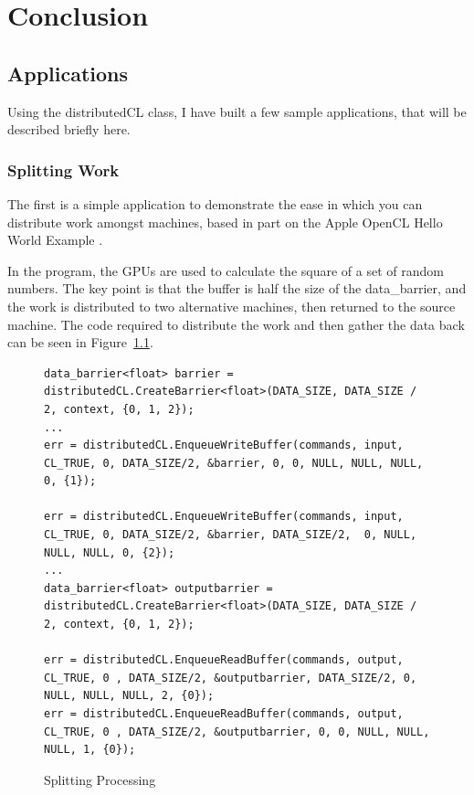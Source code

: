 \documentclass[../thesis.tex]{subfiles}
\begin{document}
\chapter{Conclusion}

\label{ch:conclusions}

\section{Applications}

Using the distributedCL class, I have built a few sample applications, that will be described briefly here.

\subsection{Splitting Work} %
\label{sub:splitting_work}

The first is a simple application to demonstrate the ease in which you can distribute work amongst machines, based in part on the Apple OpenCL Hello World Example \cite{applehelloworld}.

In the program, the GPUs are used to calculate the square of a set of random numbers. The key point is that the buffer is half the size of the data\_barrier, and the work is distributed to two alternative machines, then returned to the source machine. The code required to distribute the work and then gather the data back can be seen in Figure~\ref{fig:split_work}.

\begin{figure}[htbp]
    \centering
    \lstset{language=cpp}
    \begin{lstlisting}
data_barrier<float> barrier = distributedCL.CreateBarrier<float>(DATA_SIZE, DATA_SIZE / 2, context, {0, 1, 2});
...
err = distributedCL.EnqueueWriteBuffer(commands, input, CL_TRUE, 0, DATA_SIZE/2, &barrier, 0, 0, NULL, NULL, NULL, 0, {1});

err = distributedCL.EnqueueWriteBuffer(commands, input, CL_TRUE, 0, DATA_SIZE/2, &barrier, DATA_SIZE/2,  0, NULL, NULL, NULL, 0, {2});
...
data_barrier<float> outputbarrier = distributedCL.CreateBarrier<float>(DATA_SIZE, DATA_SIZE / 2, context, {0, 1, 2});

err = distributedCL.EnqueueReadBuffer(commands, output, CL_TRUE, 0 , DATA_SIZE/2, &outputbarrier, DATA_SIZE/2, 0, NULL, NULL, NULL, 2, {0});
err = distributedCL.EnqueueReadBuffer(commands, output, CL_TRUE, 0 , DATA_SIZE/2, &outputbarrier, 0, 0, NULL, NULL, NULL, 1, {0});
    \end{lstlisting}
    \caption{Splitting Processing}
    \label{fig:split_work}
\end{figure}
\end{document}
